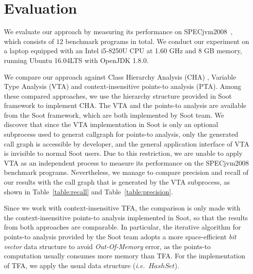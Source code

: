 \documentclass{fac}
\newcommand\ie{\textit{i.e.\ }}
\begin{document}
\section{Evaluation}\label{sec:evaluation}
We evaluate our approach by measuring its performance on SPECjvm2008~\cite{specjvm}, which consists of $12$ benchmark programs in total. We conduct our experiment on a laptop equipped with an Intel i5-8250U CPU at 1.60 GHz and 8 GB memory, running Ubuntu 16.04LTS with OpenJDK 1.8.0.

We compare our approach against Class Hierarchy Analysis (CHA) , Variable Type Analysis (VTA) and context-insensitive points-to analysis (PTA). Among these compared approaches, we use the hierarchy structure provided in Soot framework to implement CHA. The VTA and the points-to analysis are available from the Soot framework, which are both implemented by Soot team. We discover that since the VTA implementation in Soot is only an optional subprocess used to generat callgraph for points-to analysis, only the generated call graph is accessible by developer, and the general application interface of VTA is invisible to normal Soot users. Due to this restriction, we are unable to apply VTA as an independent process to measure its performance on the SPECjvm2008 benchmark programs. Nevertheless, we manage to compare precision and recall of our results with the call graph that is generated by the VTA subprocess, as shown in Table~\ref{table:recall} and Table~\ref{table:precision}.

Since we work with context-insensitive TFA, the comparison is only made with the context-insensitive points-to analysis implemented in Soot, so that
the results from both approaches are comparable. In particular, the iterative algorithm for points-to analysis %
provided by the Soot team adopts a more space-efficient \emph{bit vector} data structure to avoid \emph{Out-Of-Memory} error, 
as the points-to computation usually consumes more memory than TFA. For the implementation of TFA, we apply the usual data structure (\ie $HashSet$).
%
\end{document}
